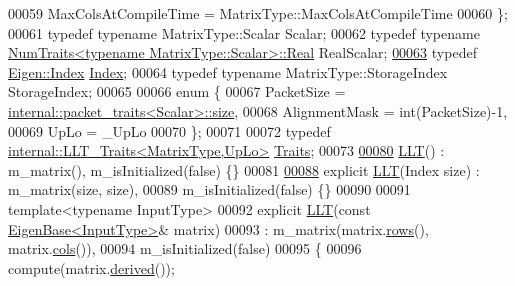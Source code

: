\begin{DoxyCode}
00059       MaxColsAtCompileTime = MatrixType::MaxColsAtCompileTime
00060     \};
00061     \textcolor{keyword}{typedef} \textcolor{keyword}{typename} MatrixType::Scalar Scalar;
00062     \textcolor{keyword}{typedef} \textcolor{keyword}{typename} \hyperlink{group___core___module_struct_eigen_1_1_num_traits}{NumTraits<typename MatrixType::Scalar>::Real}
       RealScalar;
\hyperlink{group___cholesky___module_ac7a64274814fa76e8b1e9e945546037f}{00063}     \textcolor{keyword}{typedef} \hyperlink{namespace_eigen_a62e77e0933482dafde8fe197d9a2cfde}{Eigen::Index} \hyperlink{group___cholesky___module_ac7a64274814fa76e8b1e9e945546037f}{Index}; 
00064     \textcolor{keyword}{typedef} \textcolor{keyword}{typename} MatrixType::StorageIndex StorageIndex;
00065 
00066     \textcolor{keyword}{enum} \{
00067       PacketSize = \hyperlink{struct_eigen_1_1internal_1_1packet__traits}{internal::packet\_traits<Scalar>::size},
00068       AlignmentMask = int(PacketSize)-1,
00069       UpLo = \_UpLo
00070     \};
00071 
00072     \textcolor{keyword}{typedef} \hyperlink{struct_eigen_1_1internal_1_1_l_l_t___traits}{internal::LLT\_Traits<MatrixType,UpLo>} 
      \hyperlink{struct_eigen_1_1internal_1_1_l_l_t___traits}{Traits};
00073 
\hyperlink{group___cholesky___module_a16d1ec9ea6497ba1febb242c2e8a7a96}{00080}     \hyperlink{group___cholesky___module_a16d1ec9ea6497ba1febb242c2e8a7a96}{LLT}() : m\_matrix(), m\_isInitialized(false) \{\}
00081 
\hyperlink{group___cholesky___module_ab3656cfbdf38e03c57d5cf79bf8131b6}{00088}     \textcolor{keyword}{explicit} \hyperlink{group___cholesky___module_ab3656cfbdf38e03c57d5cf79bf8131b6}{LLT}(Index size) : m\_matrix(size, size),
00089                     m\_isInitialized(false) \{\}
00090 
00091     \textcolor{keyword}{template}<\textcolor{keyword}{typename} InputType>
00092     \textcolor{keyword}{explicit} \hyperlink{group___cholesky___module_class_eigen_1_1_l_l_t}{LLT}(\textcolor{keyword}{const} \hyperlink{group___core___module_struct_eigen_1_1_eigen_base}{EigenBase<InputType>}& matrix)
00093       : m\_matrix(matrix.\hyperlink{group___core___module_a8141320ba8df384426c298b32b000d8e}{rows}(), matrix.\hyperlink{group___core___module_a7b0b45c7351847696c911ce8aa2abbdb}{cols}()),
00094         m\_isInitialized(\textcolor{keyword}{false})
00095     \{
00096       compute(matrix.\hyperlink{group___core___module_a324b16961a11d2ecfd2d1b7dd7946545}{derived}());

\end{DoxyCode}

